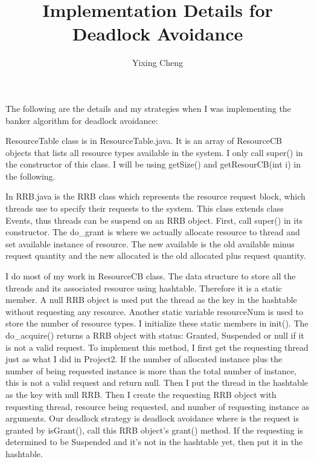 \documentclass[11pt]{article}
\title{\textbf{Implementation Details for Deadlock Avoidance}}
\author{Yixing Cheng}
\date{}
\begin{document}
\maketitle

\section*{}

The following are the details and my strategies when I was implementing the banker algorithm for deadlock avoidance:

ResourceTable class is in ResourceTable.java. It is an array of ResourceCB objects that lists all resource types available in the system. I only call super() in the constructor of this class. I will be using getSize() and getResourCB(int i) in the following.

In RRB.java is the RRB class which represents the resource request block, which threads use to specify their requests to the system. This class extends class Events, thus threads can be suspend on an RRB object. First, call super() in its constructor. The do\_grant is where we actually allocate resource to thread and set available instance of resource. The new available is the old available minus request quantity and the new allocated is the old allocated plus request quantity.

I do most of my work in ResourceCB class. The data structure to store all the threads and its associated resource using hashtable. Therefore it is a static member. A null RRB object is used put the thread as the key in the hashtable without requesting any resource. Another static variable resourceNum is used to store the number of resource types. I initialize these static members in init(). The do\_acquire() returns a RRB object with status: Granted, Suspended or null if it is not a valid request. To implement this method, I first get the requesting thread just as what I did in Project2. If the number of allocated instance plus the number of being requested instance is more than the total number of instance, this is not a valid request and return null. Then I put the thread in the hashtable as the key with null RRB. Then I create the requesting RRB object with requesting thread, resource being requested, and number of requesting instance as arguments. Our deadlock strategy is deadlock avoidance where is the request is granted by isGrant(), call this RRB object's grant() method. If the requesting is determined to be Suspended and it's not in the hashtable yet, then put it in the hashtable.
\end{document}
